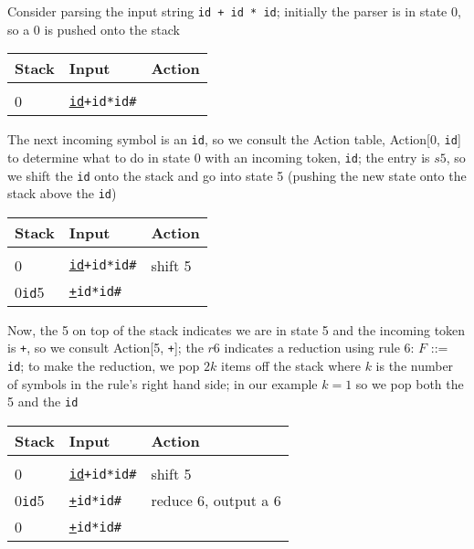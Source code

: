 \documentclass[8pt,a4paper,compress]{beamer}
\begin{document}
\begin{frame}[fragile]
\pause

Consider parsing the input string \lstinline{id + id * id}; initially the parser is in state 0, so a 0 is pushed onto the stack

\begin{table}[H]
\begin{tabular}{lll}
Stack & Input & Action \\ \hline \\
0 & \underline{\lstinline$id$}\lstinline$+id*id#$ &
\end{tabular}
\end{table}

\pause
\bigskip

The next incoming symbol is an \lstinline$id$, so we consult the Action table, Action[0, \lstinline{id}] to determine what to do in state 0 with an incoming token, \lstinline{id}; the entry is $s5$, so we shift the \lstinline{id} onto the stack and go into state 5 (pushing the new state onto the stack above the \lstinline{id})

\begin{table}[H]
\begin{tabular}{lll}
Stack & Input & Action \\ \hline \\
0 & \underline{\lstinline$id$}\lstinline$+id*id#$ & shift 5 \\
0\lstinline$id$5 & \underline{\lstinline$+$}\lstinline$id*id#$ &
\end{tabular}
\end{table}

\pause
\bigskip

Now, the 5 on top of the stack indicates we are in state 5 and the incoming token is \lstinline{+}, so we consult Action[5, \lstinline{+}]; the $r6$ indicates a reduction using rule 6: $F$ ::= \lstinline{id}; to make the reduction, we pop $2k$ items off the stack where $k$ is the number of symbols in the rule's right hand side; in our example $k = 1$ so we pop both the 5 and the \lstinline{id}

\begin{table}[H]
\begin{tabular}{lll}
Stack & Input & Action \\ \hline \\
0 & \underline{\lstinline$id$}\lstinline$+id*id#$ & shift 5 \\
0\lstinline$id$5 & \underline{\lstinline$+$}\lstinline$id*id#$ & reduce 6, output a 6 \\
0 & \underline{\lstinline$+$}\lstinline$id*id#$ &
\end{tabular}
\end{table}
\end{frame}
\end{document}
